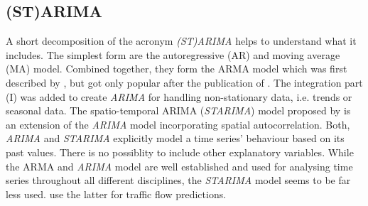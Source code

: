 \documentclass[a4paper,reqno,]{article}
\begin{document}
\subsection{(ST)ARIMA}
\label{ssec:starima}
A short decomposition of the acronym \textit{(ST)ARIMA} helps to understand what it includes. The simplest form are the autoregressive (AR) and moving average (MA) model. Combined together, they form the ARMA model which was first described by \cite{gurland1954hypothesis}, but got only popular after the publication of \cite{BoxGeorgeE.P1970TSAF}. The integration part (I) was added to create \textit{ARIMA} for handling non-stationary data, i.e. trends or seasonal data. The spatio-temporal ARIMA (\textit{STARIMA}) model proposed by \cite{pfeifer1981seasonal} is an extension of the \textit{ARIMA} model incorporating spatial autocorrelation. Both, \textit{ARIMA} and \textit{STARIMA} explicitly model a time series' behaviour based on its past values. There is no possiblity to include other explanatory variables. While the ARMA and \textit{ARIMA} model are well established and used for analysing time series throughout all different disciplines, the \textit{STARIMA} model seems to be far less used. \cite{Islam-KhanRezwan2012PTTi, ChengTao2014ADSW, PeiboDuan2016Stpw} use the latter for traffic flow predictions.
\end{document}
